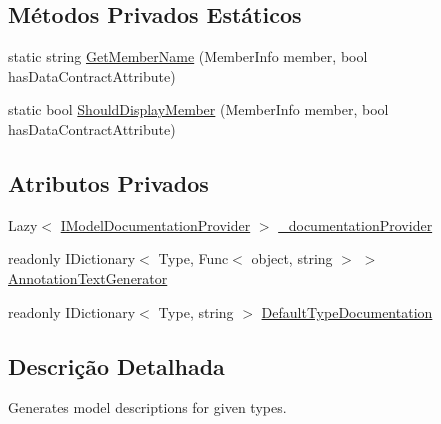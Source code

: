 \subsection*{Métodos Privados Estáticos}
\begin{DoxyCompactItemize}
\item 
static string \hyperlink{classApi3Layers_1_1Areas_1_1HelpPage_1_1ModelDescriptions_1_1ModelDescriptionGenerator_a268cc276ed084ff82617982818a8fc11}{Get\+Member\+Name} (Member\+Info member, bool has\+Data\+Contract\+Attribute)
\item 
static bool \hyperlink{classApi3Layers_1_1Areas_1_1HelpPage_1_1ModelDescriptions_1_1ModelDescriptionGenerator_a4002b466b6f40e9127162ccf3a2bd49d}{Should\+Display\+Member} (Member\+Info member, bool has\+Data\+Contract\+Attribute)
\end{DoxyCompactItemize}
\subsection*{Atributos Privados}
\begin{DoxyCompactItemize}
\item 
Lazy$<$ \hyperlink{interfaceApi3Layers_1_1Areas_1_1HelpPage_1_1ModelDescriptions_1_1IModelDocumentationProvider}{I\+Model\+Documentation\+Provider} $>$ \hyperlink{classApi3Layers_1_1Areas_1_1HelpPage_1_1ModelDescriptions_1_1ModelDescriptionGenerator_ac6c66f56f0e7953a9ca3d1b25394a922}{\+\_\+documentation\+Provider}
\item 
readonly I\+Dictionary$<$ Type, Func$<$ object, string $>$ $>$ \hyperlink{classApi3Layers_1_1Areas_1_1HelpPage_1_1ModelDescriptions_1_1ModelDescriptionGenerator_a8ff972f20473e943bcc5a435cd8921dc}{Annotation\+Text\+Generator}
\item 
readonly I\+Dictionary$<$ Type, string $>$ \hyperlink{classApi3Layers_1_1Areas_1_1HelpPage_1_1ModelDescriptions_1_1ModelDescriptionGenerator_a439e9d56d8dd09e116c825d3f0f6afe7}{Default\+Type\+Documentation}
\end{DoxyCompactItemize}


\subsection{Descrição Detalhada}
Generates model descriptions for given types. 



